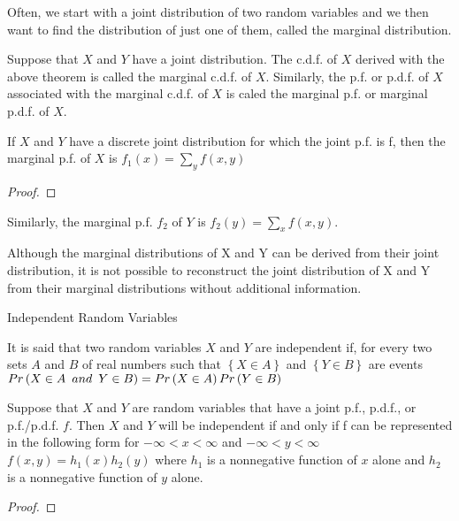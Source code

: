 {\color{red} Often, we start with a joint distribution of two random variables and we then want to find the distribution of just one of them, called the marginal distribution.}

\begin{definition}
Suppose that $X$ and $Y$ have a joint distribution. The c.d.f. of $X$ derived with the above theorem is called the marginal c.d.f. of $X$. Similarly, the p.f. or p.d.f. of $X$ associated with the marginal c.d.f. of $X$ is caled the marginal p.f. or marginal p.d.f. of $X$.
\end{definition}

\begin{proposition}
If $X$ and $Y$ have a discrete joint distribution for which the joint p.f. is f, then the marginal p.f. of $X$ is $f_{1}\left(x\right)=\sum_{y}f\left(x,y\right)$
\end{proposition}
\begin{proof}
\end{proof}

{\color{red} Similarly, the marginal p.f. $f_{2}$ of $Y$ is $f_{2} \left(y\right)=\sum_{x}f\left(x,y\right)$.}

{\color{red} Although the marginal distributions of X and Y can be derived from their joint distribution, it is not possible to reconstruct the joint distribution of X and Y from their marginal distributions without additional information.}

{\color{red} Independent Random Variables}

\begin{definition}
It is said that two random variables $X$ and $Y$ are independent if, for every two sets $A$ and $B$ of real numbers such that $\left\{ X\in A\right\}$ and $\left\{ Y\in B\right\}$ are events $Pr\left(X\in A\enskip and\enskip Y\in B\right)=Pr\left(X\in A\right)Pr\left(Y\in B\right)$
\end{definition}

\begin{proposition}
Suppose that $X$ and $Y$ are random variables that have a joint p.f., p.d.f., or p.f./p.d.f. $f$. Then $X$ and $Y$ will be independent if and only if f can be represented in the following form for $-\infty<x<\infty$ and $-\infty<y<\infty$ $f\left(x,y\right)=h_{1}\left(x\right)h_{2}\left(y\right)$ where $h_{1}$ is a nonnegative function of $x$ alone and $h_{2}$ is a nonnegative function of $y$ alone.
\end{proposition}
\begin{proof}
\end{proof}


